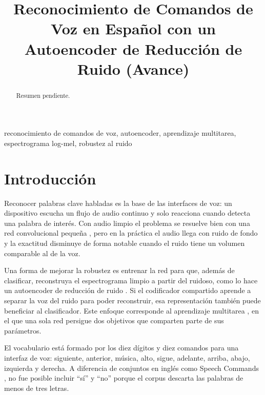 \documentclass[conference]{IEEEtran}
\begin{document}
\title{Reconocimiento de Comandos de Voz en Español con un Autoencoder de Reducción de Ruido (Avance)}

\author{
}

\maketitle

\begin{abstract}
Resumen pendiente.
\end{abstract}

\begin{IEEEkeywords}
reconocimiento de comandos de voz, autoencoder, aprendizaje multitarea, espectrograma log-mel, robustez al ruido
\end{IEEEkeywords}

\section{Introducción}
Reconocer palabras clave habladas es la base de las interfaces de voz: un dispositivo escucha un flujo de audio continuo y solo reacciona cuando detecta una palabra de interés. Con audio limpio el problema se resuelve bien con una red convolucional pequeña \cite{b1}, pero en la práctica el audio llega con ruido de fondo y la exactitud disminuye de forma notable cuando el ruido tiene un volumen comparable al de la voz.

Una forma de mejorar la robustez es entrenar la red para que, además de clasificar, reconstruya el espectrograma limpio a partir del ruidoso, como lo hace un autoencoder de reducción de ruido \cite{b4}. Si el codificador compartido aprende a separar la voz del ruido para poder reconstruir, esa representación también puede beneficiar al clasificador. Este enfoque corresponde al aprendizaje multitarea \cite{b6}, en el que una sola red persigue dos objetivos que comparten parte de sus parámetros.

El vocabulario está formado por los diez dígitos y diez comandos para una interfaz de voz: siguiente, anterior, música, alto, sigue, adelante, arriba, abajo, izquierda y derecha. A diferencia de conjuntos en inglés como Speech Commands \cite{b7}, no fue posible incluir ``sí'' y ``no'' porque el corpus descarta las palabras de menos de tres letras.
\end{document}
